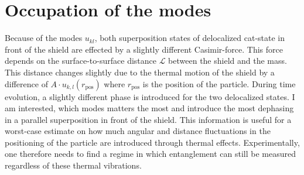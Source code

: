 \section{Occupation of the modes}
Because of the modes $u_{kl}$, both superposition states of delocalized cat-state in front of the shield are effected by a slightly different Casimir-force. This force depends on the surface-to-surface distance $\mathscr{L}$ between the shield and the mass.
This distance changes slightly due to the thermal motion of the shield by a difference of $A \cdot u_{k,l}(r_\mathrm{pos})$ where $r_\mathrm{pos}$ is the position of the particle. 
During time evolution, a slightly different phase is introduced for the two delocalized states. 
I am interested, which modes matters the most and introduce the most dephasing in a parallel superposition in front of the shield. This information is useful for a worst-case estimate on how much angular and distance fluctuations in the positioning of the particle are introduced through thermal effects. 
Experimentally, one therefore needs to find a regime in which entanglement can still be measured regardless of these thermal vibrations.

